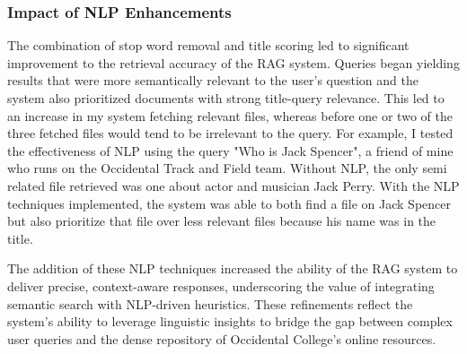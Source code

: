 \documentclass[10pt,twocolumn]{article}
\begin{document}
\subsubsection{Impact of NLP Enhancements}

The combination of stop word removal and title scoring led to significant improvement to the retrieval accuracy of the RAG system. Queries began yielding results that were more semantically relevant to the user’s question and the system also prioritized documents with strong title-query relevance. This led to an increase in my system fetching relevant files, whereas before one or two of the three fetched files would tend to be  irrelevant to the query. For example, I tested the effectiveness of NLP using the query "Who is Jack Spencer", a friend of mine who runs on the Occidental Track and Field team. Without NLP, the only semi related file retrieved was one about actor and musician Jack Perry. With the NLP techniques implemented, the system was able to both find a file on Jack Spencer but also prioritize that file over less relevant files because his name was in the title.

The addition of these NLP techniques increased the ability of the RAG system to deliver precise, context-aware responses, underscoring the value of integrating semantic search with NLP-driven heuristics. These refinements reflect the system's ability to leverage linguistic insights to bridge the gap between complex user queries and the dense repository of Occidental College’s online resources.
\end{document}
